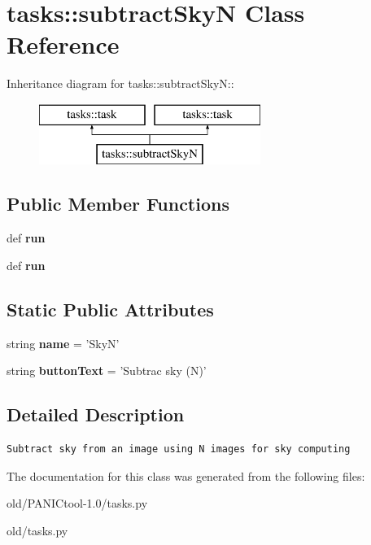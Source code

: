 \section{tasks::subtract\-Sky\-N Class Reference}
\label{classtasks_1_1subtractSkyN}
Inheritance diagram for tasks::subtract\-Sky\-N::\begin{figure}[H]
\begin{center}
\leavevmode
\includegraphics[height=2cm]{classtasks_1_1subtractSkyN}
\end{center}
\end{figure}
\subsection*{Public Member Functions}
\begin{CompactItemize}
\item 
def \textbf{run}\label{classtasks_1_1subtractSkyN_eb683a767a22ed0724c29ef695b1269e}

\item 
def \textbf{run}\label{classtasks_1_1subtractSkyN_eb683a767a22ed0724c29ef695b1269e}

\end{CompactItemize}
\subsection*{Static Public Attributes}
\begin{CompactItemize}
\item 
string \textbf{name} = '{\bfsubtract\-Sky\-N}'\label{classtasks_1_1subtractSkyN_8584fba620680fed12440a401274c339}

\item 
string \textbf{button\-Text} = 'Subtrac sky (N)'\label{classtasks_1_1subtractSkyN_0210339b077a88fbee9fcaa4683fce73}

\end{CompactItemize}


\subsection{Detailed Description}


\footnotesize\begin{verbatim}Subtract sky from an image using N images for sky computing
\end{verbatim}
\normalsize
 



The documentation for this class was generated from the following files:\begin{CompactItemize}
\item 
old/PANICtool-1.0/tasks.py\item 
old/tasks.py\end{CompactItemize}
